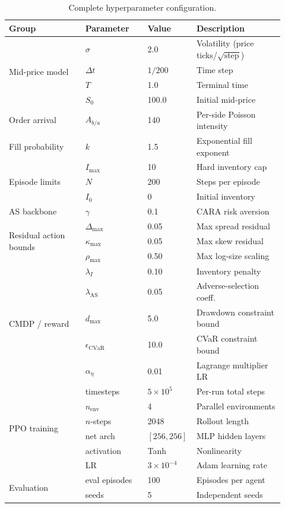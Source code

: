 \documentclass[11pt]{article}
\begin{document}
\begin{table}[H]
\centering
\caption{Complete hyperparameter configuration.}
\label{tab:all_hparams}
\small
\begin{tabular}{@{}p{0.27\linewidth}p{0.22\linewidth}p{0.12\linewidth}
                 p{0.31\linewidth}@{}}
\toprule
Group & Parameter & Value & Description \\
\midrule
\multirow{4}{*}{Mid-price model}
  & $\sigma$    & 2.0         & Volatility (price ticks/$\sqrt{\text{step}}$) \\
  & $\Delta t$  & $1/200$     & Time step \\
  & $T$         & 1.0         & Terminal time \\
  & $S_0$       & 100.0       & Initial mid-price \\
\midrule
Order arrival
  & $A_{b/a}$   & 140         & Per-side Poisson intensity \\
\midrule
Fill probability
  & $k$         & 1.5         & Exponential fill exponent \\
\midrule
\multirow{3}{*}{Episode limits}
  & $I_{\max}$  & 10          & Hard inventory cap \\
  & $N$         & 200         & Steps per episode \\
  & $I_0$       & 0           & Initial inventory \\
\midrule
AS backbone
  & $\gamma$    & 0.1         & CARA risk aversion \\
\midrule
\multirow{3}{*}{Residual action bounds}
  & $\Delta_{\max}$  & 0.05   & Max spread residual \\
  & $\kappa_{\max}$  & 0.05   & Max skew residual \\
  & $\rho_{\max}$    & 0.50   & Max log-size scaling \\
\midrule
\multirow{5}{*}{CMDP / reward}
  & $\lambda_I$          & 0.10  & Inventory penalty \\
  & $\lambda_{\text{AS}}$& 0.05  & Adverse-selection coeff. \\
  & $d_{\max}$           & 5.0   & Drawdown constraint bound \\
  & $\epsilon_{\text{CVaR}}$ & 10.0 & CVaR constraint bound \\
  & $\alpha_\eta$        & 0.01  & Lagrange multiplier LR \\
\midrule
\multirow{6}{*}{PPO training}
  & timesteps     & $5\!\times\!10^5$ & Per-run total steps \\
  & $n_\text{env}$& 4          & Parallel environments \\
  & $n$-steps     & 2048       & Rollout length \\
  & net arch      & $[256,256]$& MLP hidden layers \\
  & activation    & Tanh       & Nonlinearity \\
  & LR            & $3\!\times\!10^{-4}$ & Adam learning rate \\
\midrule
\multirow{2}{*}{Evaluation}
  & eval episodes & 100        & Episodes per agent \\
  & seeds         & 5          & Independent seeds \\
\bottomrule
\end{tabular}
\end{table}
\end{document}
